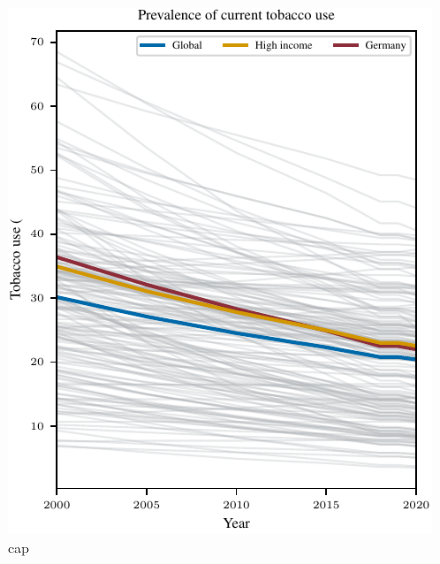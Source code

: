 \begin{figure}[ht]
\vskip 0.2in
\begin{center}
\centerline{\includegraphics[width=\columnwidth]{fig/fig_TobaccoUsePercentage.pdf}}
\caption{cap}
\label{TobaccoUsePercentage}
\end{center}
\vskip -0.2in
\end{figure}